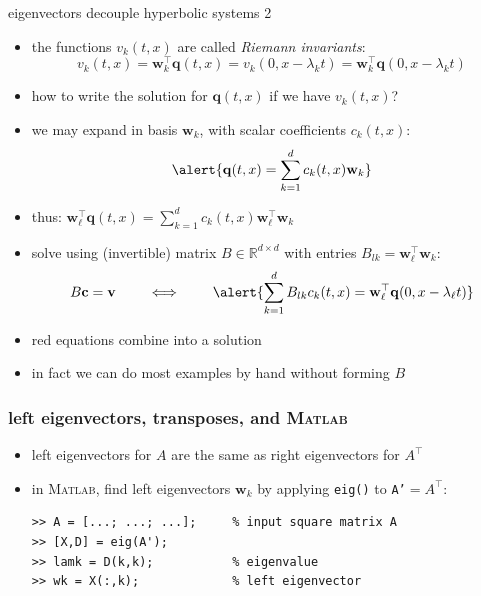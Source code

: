 \documentclass[10pt,hyperref,dvipsnames]{beamer}
\newcommand{\bc}{\mathbf{c}}
\newcommand{\bq}{\mathbf{q}}
\newcommand{\bv}{\mathbf{v}}
\newcommand{\bw}{\mathbf{w}}
\newcommand{\RR}{\mathbb{R}}
\newcommand{\Matlab}{\textsc{Matlab}\xspace}
\newcommand{\ds}{\displaystyle}
\begin{document}
\begin{frame}{eigenvectors decouple hyperbolic systems 2}

\begin{itemize}
\item the functions $v_k(t,x)$ are called \emph{Riemann invariants}:
    $$v_k(t,x) = \bw_k^\top \bq(t,x) = v_k(0,x-\lambda_k t) = \bw_k^\top \bq(0,x-\lambda_k t)$$
\item how to write the solution for $\bq(t,x)$ if we have $v_k(t,x)$?
\item we may expand in basis $\bw_k$, with scalar coefficients $c_k(t,x)$:
    $$\alert{\bq(t,x) = \sum_{k=1}^d c_k(t,x) \bw_k}$$
\item thus: \qquad $\ds \bw_\ell^\top \bq(t,x) = \sum_{k=1}^d c_k(t,x) \bw_\ell^\top \bw_k$
\item solve using (invertible) matrix $B\in \RR^{d\times d}$ with entries \alert{$B_{lk} = \bw_\ell^\top \bw_k$}:
    $$B \bc = \bv \qquad \iff \qquad \alert{\sum_{k=1}^d B_{lk} c_k(t,x) = \bw_\ell^\top \bq(0,x-\lambda_\ell t)}$$
\item \alert{red equations} combine into a solution
\item in fact we can do most examples by hand without forming $B$
\end{itemize}
\end{frame}


\begin{frame}[fragile]
\frametitle{left eigenvectors, transposes, and \Matlab}

\begin{itemize}
\item left eigenvectors for $A$ are the same as right eigenvectors for $A^\top$
\item in \Matlab, find left eigenvectors $\bw_k$ by applying \texttt{eig()} to \texttt{A'}$=A^\top$:
\begin{Verbatim}[fontsize=\small]
>> A = [...; ...; ...];     % input square matrix A
>> [X,D] = eig(A');
>> lamk = D(k,k);           % eigenvalue
>> wk = X(:,k);             % left eigenvector
\end{Verbatim}
\end{itemize}
\end{frame}
\end{document}
